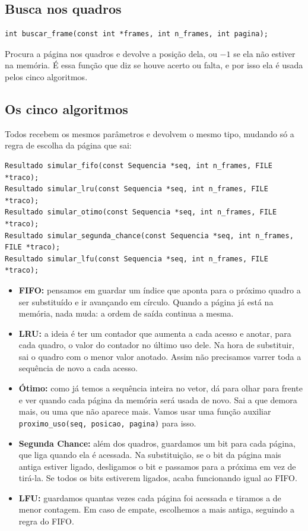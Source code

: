 \documentclass[12pt]{article}
\begin{document}
\subsection{Busca nos quadros}
\label{sec:busca}

{\scriptsize
\begin{verbatim}
int buscar_frame(const int *frames, int n_frames, int pagina);
\end{verbatim}
}

Procura a página nos quadros e devolve a posição dela, ou $-1$ se ela não
estiver na memória. É essa função que diz se houve acerto ou falta, e por isso
ela é usada pelos cinco algoritmos.

\subsection{Os cinco algoritmos}
\label{sec:algoritmos}

Todos recebem os mesmos parâmetros e devolvem o mesmo tipo, mudando só a regra de
escolha da página que sai:

{\scriptsize
\begin{verbatim}
Resultado simular_fifo(const Sequencia *seq, int n_frames, FILE *traco);
Resultado simular_lru(const Sequencia *seq, int n_frames, FILE *traco);
Resultado simular_otimo(const Sequencia *seq, int n_frames, FILE *traco);
Resultado simular_segunda_chance(const Sequencia *seq, int n_frames, FILE *traco);
Resultado simular_lfu(const Sequencia *seq, int n_frames, FILE *traco);
\end{verbatim}
}

\begin{itemize}
    \item \textbf{FIFO:} pensamos em guardar um índice que aponta para o próximo
    quadro a ser substituído e ir avançando em círculo. Quando a página já está
    na memória, nada muda: a ordem de saída continua a mesma.
    \item \textbf{LRU:} a ideia é ter um contador que aumenta a cada acesso e
    anotar, para cada quadro, o valor do contador no último uso dele. Na hora de
    substituir, sai o quadro com o menor valor anotado. Assim não precisamos
    varrer toda a sequência de novo a cada acesso.
    \item \textbf{Ótimo:} como já temos a sequência inteira no vetor, dá para
    olhar para frente e ver quando cada página da memória será usada de novo.
    Sai a que demora mais, ou uma que não aparece mais. Vamos usar uma função
    auxiliar \texttt{proximo\_uso(seq, posicao, pagina)} para isso.
    \item \textbf{Segunda Chance:} além dos quadros, guardamos um bit para cada
    página, que liga quando ela é acessada. Na substituição, se o bit da página
    mais antiga estiver ligado, desligamos o bit e passamos para a próxima em vez
    de tirá-la. Se todos os bits estiverem ligados, acaba funcionando igual ao
    FIFO.
    \item \textbf{LFU:} guardamos quantas vezes cada página foi acessada e
    tiramos a de menor contagem. Em caso de empate, escolhemos a mais antiga,
    seguindo a regra do FIFO.
\end{itemize}
\end{document}
